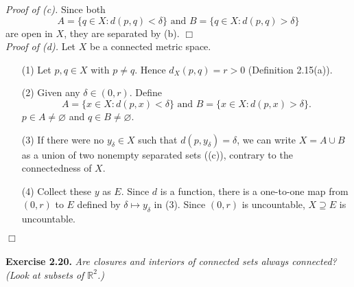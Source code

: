 \documentclass{article}
\begin{document}
\emph{Proof of (c).}
Since both
$$A = \{ q \in X : d(p,q) < \delta \} \text{ and } B = \{ q \in X : d(p,q) > \delta \}$$
are open in $X$, they are separated by (b).
$\Box$ \\

\emph{Proof of (d).}
Let $X$ be a connected metric space.
\begin{enumerate}
\item[(1)]
Let $p, q \in X$ with $p \neq q$.
Hence $d_X(p,q) = r > 0$ (Definition 2.15(a)).
\item[(2)]
Given any $\delta \in (0, r)$.
Define
$$A = \{ x \in X : d(p,x) < \delta \} \text{ and } B = \{ x \in X : d(p,x) > \delta \}.$$
$p \in A \neq \varnothing$ and $q \in B \neq \varnothing$.
\item[(3)]
If there were no $y_{\delta} \in X$ such that $d(p,y_{\delta}) = \delta$,
we can write $X = A \cup B$ as a union of two nonempty separated sets ((c)),
contrary to the connectedness of $X$.
\item[(4)]
Collect these $y$ as $E$.
Since $d$ is a function, there is a one-to-one map from $(0,r)$ to $E$
defined by $\delta \mapsto y_{\delta}$ in (3).
Since $(0,r)$ is uncountable, $X \supseteq E$ is uncountable.
\end{enumerate}
$\Box$ \\\\






\textbf{Exercise 2.20.}
\emph{Are closures and interiors of connected sets always connected?
(Look at subsets of $\mathbb{R}^2$.)} \\
\end{document}
